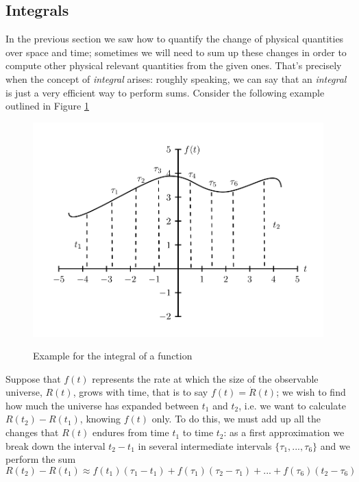 \subsection{Integrals}
In the previous section we saw how to quantify the change of physical quantities over space and time; sometimes we will need to sum up these changes in order to compute other physical relevant quantities from the given ones. That's precisely when the concept of \textit{integral} arises: roughly speaking, we can say that an \textit{integral} is just a very efficient way to perform sums. Consider the following example outlined in Figure \ref{function}
\begin{figure}
\begin{center}
\includegraphics[scale=0.7]{Draw/function.png}
\label{}
\end{center}
\caption{Example for the integral of a function}
\label{function}
\end{figure}
Suppose that $f(t)$ represents the rate at which the size of the observable universe, $R(t)$, grows with time, that is to say $f(t)=\dot{R}(t)$; we wish to find how much the universe has expanded between $t_1$ and $t_2$, i.e. we want to calculate $R(t_2)-R(t_1)$, knowing $f(t)$ only. To do this, we must add up all the changes that $R(t)$ endures from time $t_1$ to time $t_2$: as a first approximation we break down the interval $t_2-t_1$ in several intermediate intervals $\{\tau_1,...,\tau_6\}$ and we perform the sum
\begin{equation}
R(t_2)-R(t_1)\approx f(t_1)(\tau_1-t_1)+f(\tau_1)(\tau_2-\tau_1)+...+f(\tau_6)(t_2-\tau_6)
\end{equation} 
